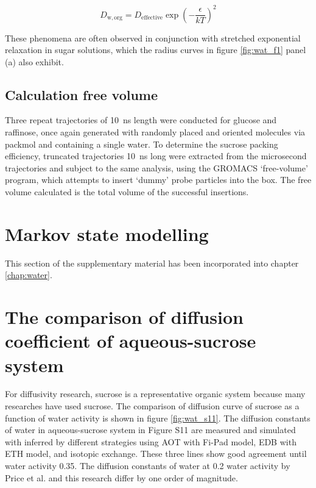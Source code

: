 \begin{equation}
D_{\mathrm{w, org}}=D_{\mathrm{effective}} \exp \left(-\frac{\epsilon}{k T}\right)^{2}
\end{equation}

These  phenomena  are  often  observed  in  conjunction  with stretched  exponential  relaxation  in  sugar solutions\cite{mesteGlassTransitionFood2002,Liu2006}, which the radius curves in figure \ref{fig:wat_f1} panel (a) also exhibit. 

\subsection{Calculation free volume}
Three repeat trajectories of \SI{10}{\nano\second} length were conducted for glucose and raffinose, once again generated with randomly placed and oriented molecules via packmol and containing a single water. To determine the sucrose packing efficiency, truncated trajectories \SI{10}{\nano\second} long were extracted from the microsecond trajectories and subject to the same analysis, using the GROMACS `free-volume’ program, which attempts to insert `dummy’ probe particles into the box. The free volume calculated is the total volume of the successful insertions.

\section{Markov state modelling}

This section of the supplementary material has been incorporated into chapter \ref{chap:water}. 
\section{The comparison of diffusion coefficient of aqueous-sucrose system}

For diffusivity research, sucrose is a representative organic system because many researches have used sucrose. The comparison of diffusion curve of sucrose as a function of water activity is shown in figure \ref{fig:wat_s11}. The diffusion constants of water in aqueous-sucrose system in Figure S11 are measured and simulated with inferred by different strategies using AOT with Fi-Pad model, EDB with ETH model, and isotopic exchange. These three lines show good agreement until water activity \num{0.35}. The diffusion constants of water at \num{0.2} water activity by Price et al.\cite{Price2014} and this research differ by one order of magnitude. 


